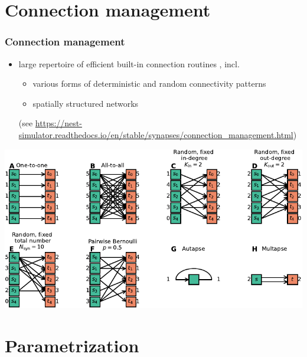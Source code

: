 \documentclass[8pt,t,usepdftitle=false]{beamer}
\begin{document}
\def\ttl{Connection management}\section{\ttl}
\begin{frame}[t,plain]
  \frametitle{\ttl}
  \begin{itemize}
  \item large repertoire of efficient built-in connection routines {\tiny\parencite{Ippen2017_30}}, incl.
    \begin{itemize}
    \item various forms of deterministic and random connectivity patterns
    \item spatially structured networks
    \end{itemize}
    {\tiny (see \url{https://nest-simulator.readthedocs.io/en/stable/synapses/connection_management.html})}  
  \end{itemize}
  \begin{center}
    \includegraphics[width=0.9\linewidth]{./figures/SenkEtAl2022_connectivity_patterns_fig7.pdf}
  \end{center}
\end{frame}
\def\ttl{Parametrization}\section{\ttl}
\end{document}
